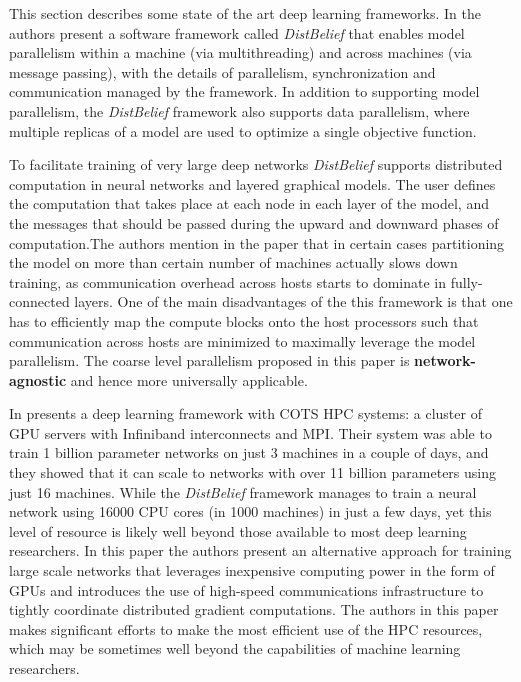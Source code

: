 This section describes some state of the art deep learning frameworks.
In \cite{JeffDean2012} the authors present a software framework called \emph{DistBelief} that enables model parallelism within a machine (via multithreading) and across machines (via message passing), with the details of parallelism, synchronization and communication managed by
the framework. In addition to supporting model parallelism, the \emph{DistBelief} framework also supports
data parallelism, where multiple replicas of a model are used to optimize a single objective function.

To facilitate training of very large deep networks \emph{DistBelief} supports distributed computation in neural networks and layered graphical models. The user defines the computation that takes place at each node in each layer of the model, and the messages that should be passed during the upward and downward phases of computation.The authors mention in the paper that in certain cases partitioning the model on more than certain number of machines actually slows down training, as communication overhead across hosts starts to dominate in fully-connected layers. One of the main disadvantages of the this framework is that one has to efficiently map the compute blocks onto the host processors such that communication across hosts are minimized to maximally leverage the model parallelism. The coarse level parallelism proposed in this paper is \textbf{network-agnostic} and hence more universally applicable.

In \cite{Coates2013}  presents a deep learning framework with COTS HPC systems: a cluster of GPU servers with Infiniband interconnects and MPI. Their system was able to train 1 billion parameter networks on just 3 machines in a couple of days, and they showed that it can scale to networks with over
11 billion parameters using just 16 machines. While the \emph{DistBelief} framework manages to train a neural network using 16000
CPU cores (in 1000 machines) in just a few days, yet this level of resource is likely well beyond those available to most deep learning researchers.
In this paper the authors present an alternative approach for training large scale networks that leverages inexpensive
computing power in the form of GPUs and introduces the use of high-speed communications infrastructure to tightly coordinate distributed gradient
computations. The authors in this paper makes significant efforts to make the most efficient use of the HPC resources, which may be sometimes well beyond the capabilities of machine learning researchers.

